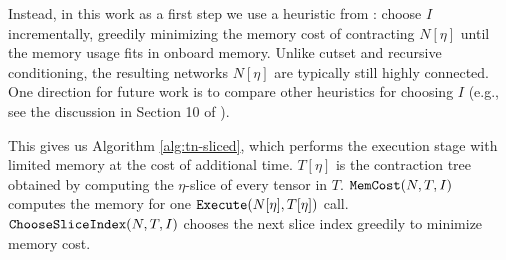 Instead, in this work as a first step we use a heuristic from \cite{CZHNS18,GK20}: choose $I$ incrementally, greedily minimizing the memory cost of contracting $N[\eta]$ until the memory usage fits in onboard memory. Unlike cutset and recursive conditioning, the resulting networks $N[\eta]$ are typically still highly connected. One direction for future work is to compare other heuristics for choosing $I$ (e.g., see the discussion in Section 10 of \cite{dechter99}).

This gives us Algorithm \ref{alg:tn-sliced}, which performs the execution stage with limited memory at the cost of additional time. $T[\eta]$ is the contraction tree obtained by computing the $\eta$-slice of every tensor in $T$. $\texttt{\upshape MemCost}(N, T, I)$ computes the memory for one $\texttt{\upshape Execute}(N[\eta], T[\eta])$ call. $\texttt{\upshape ChooseSliceIndex}(N,T,I)$ chooses the next slice index greedily to minimize memory cost.


